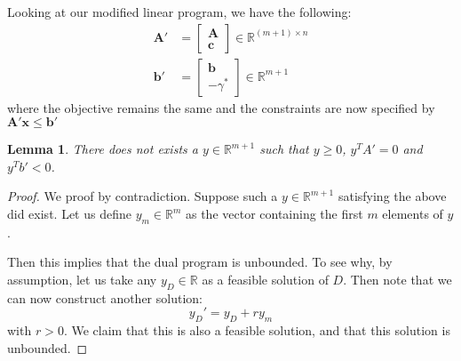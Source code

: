 \documentclass[12pt]{exam}
\newtheorem{lemma}[theorem]{Lemma}
\begin{document}
\begin{questions}
\begin{solution}
\begin{enumerate}[label=(\alph*)]
      Looking at our modified linear program, we have the following:
      \begin{align*}
        \textbf{A}' &= 
          \begin{bmatrix}
            \textbf{A} \\
            \textbf{c}
          \end{bmatrix}  \in \mathbb{R}^{(m+1) \times n}\\
      \textbf{b}' &= 
      \begin{bmatrix}
        \textbf{b}  \\
        -\gamma^{*}
      \end{bmatrix} \in \mathbb{R}^{m+1}
      \end{align*}
      where the objective remains the same and the constraints are now specified by $\textbf{A}'\textbf{x} \leq \textbf{b}'$

      \begin{lemma}
        There does not exists a $y \in \mathbb{R}^{m+1}$ such that $y \geq 0$, $y^TA' = 0$ and $y^Tb' < 0$.
      \end{lemma}
      \begin{proof}
        We proof by contradiction. Suppose such a $y \in \mathbb{R}^{m+1}$ satisfying the above did exist. Let us define $y_m \in \mathbb{R}^m$ as the vector containing the first $m$ elements of $y$.

        Then this implies that the dual program is unbounded. To see why, by assumption, let us take any $y_{D} \in \mathbb{R}$ as a feasible solution of $D$. Then note that we can now construct another solution:
        \[
          y_{D}' = y_{D} + r y_m
        \]
        with $r > 0$. We claim that this is also a feasible solution, and that this solution is unbounded.


\end{proof}
\end{enumerate}
\end{solution}
\end{questions}
\end{document}
